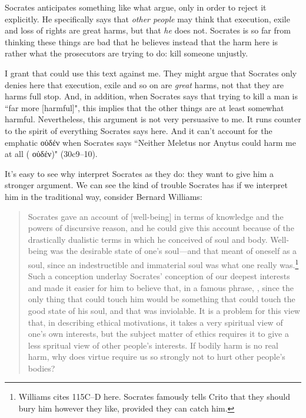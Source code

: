 \documentclass[11pt]{article}
\begin{document}
Socrates anticipates something like what \citeauthor{brickhouse2004} argue,
only in order to reject it explicitly.  He specifically says that \emph{other
people} may think that execution, exile and loss of rights are great harms, but
that \emph{he} does not.  Socrates is so far from thinking these things are bad
that he believes instead that the harm here is rather what the prosecutors are
trying to do: kill someone unjustly.

I grant that \citeauthor{brickhouse2004} could use this text against me.  They
might argue that Socrates only denies here that execution, exile and so on are
\emph{great} harms, not that they are harms full stop.  And, in addition, when
Socrates says that trying to kill a man is ``far more [harmful]", this implies
that the other things are at least somewhat harmful.  Nevertheless, this
argument is not very persuasive to me.  It runs counter to the spirit of
everything Socrates says here. And it can't account for the emphatic {\g οὐδέν}
when Socrates says ``Neither Meletus nor Anytus could harm me at all ({\g
οὐδέν})" (30c9--10).

It's easy to see why \citeauthor{brickhouse2004} interpret Socrates as they do:
they want to give him a stronger argument.  We can see the kind of trouble
Socrates has if we interpret him in the traditional way, consider Bernard
Williams:

\begin{quote}
    Socrates gave an account of [well-being] in terms of knowledge and the
    powers of discursive reason, and he could give this account because of the
    drastically dualistic terms in which he conceived of soul and body.
    Well-being was the desirable state of one's soul---and that meant of
    oneself as a soul, since an indestructible and immaterial soul was what
    one really was.\footnote{Williams cites  115C--D here.
    Socrates famously tells Crito that they should bury him however they like,
    provided they can catch him.}  Such a conception underlay Socrates'
    conception of our deepest interests and made it easier for him to believe
    that, in a famous phrase, , since the
    only thing that could touch him would be something that could touch the
    good state of his soul, and that was inviolable.  It is a problem for this
    view that, in describing ethical motivations, it takes a very spiritual
    view of one's own interests, but the subject matter of ethics requires it
    to give a less spritual view of other people's interests. If bodily harm is
    no real harm, why does virtue require us so strongly not to hurt other
    people's bodies?
    \citep[34]{williams1985}
\end{quote}
\end{document}
